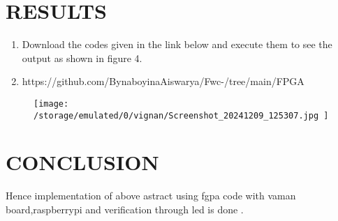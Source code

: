 \documentclass[conference]{IEEEtran}
\begin{document}
\section{RESULTS}
 \begin{enumerate}
\item Download the codes given in the link below and execute them to see the output as shown in figure 4.
\item https://github.com/BynaboyinaAiswarya/Fwc-/tree/main/FPGA

 \end{enumerate}

 \begin{figure}[h]                       
\centering                               
\texttt{[image: /storage/emulated/0/vignan/Screenshot\_20241209\_125307.jpg
  ]}                                
\caption{\label{fig-4:Gates}}             
\end{figure}
\section{CONCLUSION}
Hence implementation of above astract using fgpa code with vaman board,raspberrypi and verification through led is done .
\end{document}
